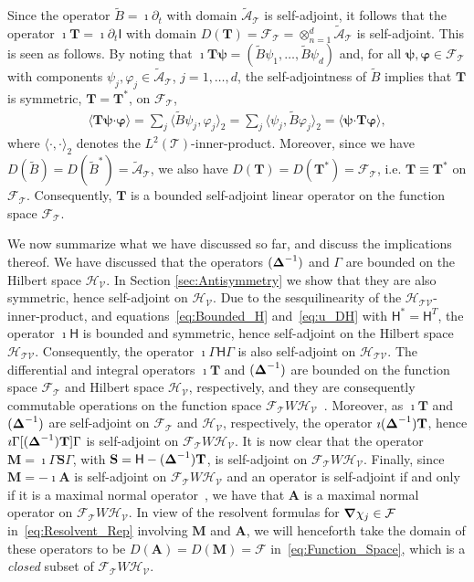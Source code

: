 \documentclass[leqno,onefignum,onetabnum]{siamltex1213}
\newcommand{\Mb}{\mathbf{M}}
\newcommand{\Tb}{\mathbf{T}}
\newcommand{\Sb}{\mathbf{S}}
\newcommand{\Ab}{\mathbf{A}}
\newcommand{\Tc}{\mathcal{T}}
\newcommand{\Vc}{\mathcal{V}}
\newcommand{\Hc}{\mathcal{H}}
\newcommand{\Fc}{\mathcal{F}}
\newcommand{\Hm}{\mathsf{H}}
\newcommand{\Ib}{\mathsf{I}}
\newcommand{\As}{\mathscr{A}}
\newcommand\bDelta{\mbox{\boldmath${\Delta}$}}
\newcommand\bnabla{\mbox{\boldmath${\nabla}$}}
\providecommand\bcdot{\boldsymbol{\cdot}}
\newcommand{\vecpsi}{\boldsymbol{\psi}}
\newcommand{\vecvarphi}{\boldsymbol{\varphi}}
\begin{document}
Since the operator $\tilde{B}=\imath\partial_t$ with domain $\tilde{\As}_{\Tc}$ is
self-adjoint, it follows that the operator $\imath\Tb=\imath\partial_t\Ib$ with domain
$D(\Tb)=\Fc_{\Tc}=\otimes_{n=1}^d\tilde{\As}_{\Tc}$ is self-adjoint. This is
seen as follows. By noting that
$\imath\Tb\vecpsi=(\tilde{B}\psi_1,\ldots,\tilde{B}\psi_d)$ and, for all 
$\vecpsi,\vecvarphi\in\Fc_{\Tc}$ with components
$\psi_j,\varphi_j\in\tilde{\As}_{\Tc}$, $j=1,\ldots,d$, the self-adjointness of 
$\tilde{B}$ implies that $\Tb$ is symmetric, $\Tb=\Tb^*$, on $\Fc_{\Tc}$, 
%
\begin{align}\label{eq:T_symmetric}
  \langle\Tb\vecpsi\bcdot\vecvarphi\rangle=\sum_j\langle\tilde{B}\psi_j,\varphi_j\rangle_2
                    =\sum_j\langle\psi_j,\tilde{B}\varphi_j\rangle_2
                    =\langle\vecpsi\bcdot\Tb\vecvarphi\rangle,
\end{align}
%
where $\langle\cdot,\cdot\rangle_2$ denotes the $L^2(\Tc)$-inner-product.  Moreover, since we have
$D(\tilde{B})=D(\tilde{B}^*)=\tilde{\As}_{\Tc}$, we also have
$D(\Tb)=D(\Tb^*)=\Fc_{\Tc}$, i.e. $\Tb\equiv\Tb^*$ on
$\Fc_{\Tc}$. Consequently, $\Tb$ is a bounded self-adjoint linear
operator on the function space $\Fc_{\Tc}$.



We now summarize what we have discussed so far, and
discuss the implications thereof. We have discussed that the 
operators $(\bDelta^{-1})$ and $\Gamma$ are bounded on the Hilbert
space $\Hc_{\Vc}$. In Section \ref{sec:Antisymmetry} we show
that they are also symmetric, hence self-adjoint on $\Hc_{\Vc}$. Due
to the sesquilinearity of the $\Hc_{\Tc\Vc}$-inner-product, and
equations~\eqref{eq:Bounded_H} and~\eqref{eq:u_DH} with $\Hm^*=\Hm^T$,
the  operator $\imath\Hm$ is bounded and symmetric, hence self-adjoint on
the Hilbert space $\Hc_{\Tc\Vc}$.  Consequently, the operator
$\imath\Gamma\Hm\Gamma$ is also self-adjoint on $\Hc_{\Tc\Vc}$. The
differential and integral operators $\imath\Tb$ and $(\bDelta^{-1})$ are 
bounded on the function space $\Fc_{\Tc}$ and Hilbert space $\Hc_{\Vc}$,
respectively, and they are consequently commutable operations on the
function space $\Fc_{\Tc}W\Hc_{\Vc}$~\cite{Folland:99:RealAnalysis}. Moreover, as
$\imath\Tb$ and $(\bDelta^{-1})$ are self-adjoint on
$\Fc_{\Tc}$ and $\Hc_{\Vc}$, respectively, the operator 
$\imath(\bDelta^{-1})\Tb$, hence $\imath\Gamma[(\bDelta^{-1})\Tb]\Gamma$ is
self-adjoint on $\Fc_{\Tc}W\Hc_{\Vc}$. It is now clear that the operator
$\Mb=\imath\Gamma\Sb\Gamma$, with $\Sb=\Hm-(\bDelta^{-1})\Tb$, is
self-adjoint on $\Fc_{\Tc}W\Hc_{\Vc}$. Finally, since $\Mb=-\imath\Ab$ is
self-adjoint on $\Fc_{\Tc}W\Hc_{\Vc}$ and an operator is
self-adjoint if and only if it is a maximal normal
operator~\cite{Stone:64}, we have that $\Ab$ is a maximal normal 
operator on $\Fc_{\Tc}W\Hc_{\Vc}$. In view of the resolvent
formulas for $\bnabla \chi_j\in\Fc$ in~\eqref{eq:Resolvent_Rep}
involving $\Mb$ and $\Ab$, we will henceforth take the domain of
these operators to be $D(\Ab)=D(\Mb)=\Fc$
in~\eqref{eq:Function_Space}, which is a \emph{closed} subset of 
$\Fc_{\Tc}W\Hc_{\Vc}$.   
\end{document}

